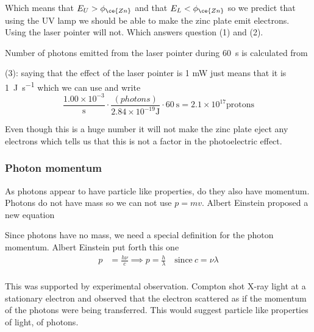 \documentclass[../mit-general-chemistry.tex]{subfiles}
\begin{document}
\begin{example}
  Which means that $E_U > \phi_{\ce{Zn}}$ and that $E_L <
  \phi_{\ce{Zn}}$ so we predict that using the UV lamp we should be
  able to make the zinc plate emit electrons. Using the laser pointer
  will not. Which answers question (1) and (2).

  Number of photons emitted from the laser pointer during
  \SI{60}{\second} is calculated from

  (3): saying that the effect of the laser pointer is 1 mW just means
  that it is \SI{1}{\joule\per\second} which we can use and write
  \begin{equation*}
    \frac{1.00\times 10^{-3}}{\si{\second}}
    \cdot \frac{(photons)}{2.84\times 10^{-19} \si{\joule}}
    \cdot \SI{60}{\second} =
    2.1\times 10^{17} \text{protons}
  \end{equation*}

  Even though this is a huge number it will not make the zinc plate
  eject any electrons which tells us that this is not a factor in the
  photoelectric effect.
\end{example}


\subsubsection{Photon momentum}

As photons appear to have particle like properties, do they also have
momentum. Photons do not have mass so we can not use $p = mv$. Albert
Einstein proposed a new equation 

\begin{definition}
  Since photons have no mass, we need a special definition for the
  photon momentum. Albert Einstein put forth this one
  \begin{align*}
    p &= \frac{h\nu}{c} \implies
    p = \frac{h}{\lambda}
    \quad\text{since}~c = \nu\lambda \\
  \end{align*}
\end{definition}


This was supported by experimental observation. Compton shot X-ray
light at a stationary electron and observed that the electron
scattered as if the momentum of the photons were being
transferred. This would suggest particle like properties of light, of
photons.
\end{document}
